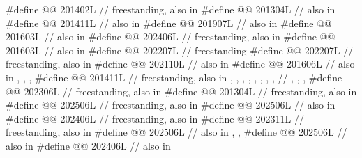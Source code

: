 \begin{codeblock}
#define @@             201402L // freestanding, also in 
#define @@                       201304L // also in 
#define @@                   201411L // also in 
#define @@                    201907L // also in 
#define @@            201603L // also in 
#define @@                            202406L // freestanding, also in 
#define @@                   201603L // also in 
#define @@                           202207L // freestanding
#define @@             202207L // freestanding, also in 
#define @@                202110L // also in 
#define @@                      201606L
  // also in , , , 
#define @@        201411L
  // freestanding, also in , , , , , , , ,
  // , , , 
#define @@                            202306L // freestanding, also in 
#define @@                    201304L // freestanding, also in 
#define @@             202506L // freestanding, also in 
#define @@                          202506L // also in 
#define @@            202406L // freestanding, also in 
#define @@                           202311L // freestanding, also in 
#define @@                202506L
  // also in , , 
#define @@                202506L // also in 
#define @@                     202406L // also in 

\end{codeblock}

